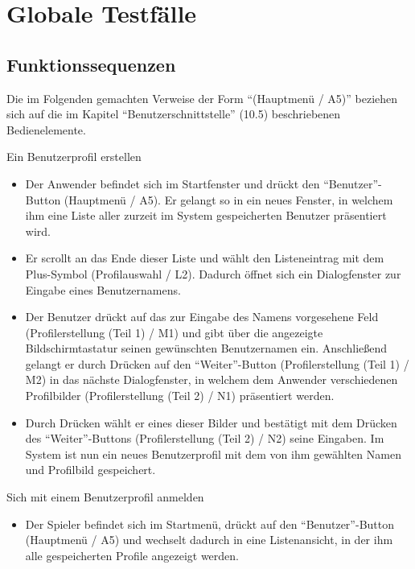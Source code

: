\section{Globale Testfälle}

\subsection{Funktionssequenzen}

Die im Folgenden gemachten Verweise der Form "`(Hauptmenü / A5)"' beziehen sich auf die im Kapitel "`Benutzerschnittstelle"'  (10.5) beschriebenen Bedienelemente.

\begin{requirements}

	 Ein Benutzerprofil erstellen
	
	
	\begin{itemize}
  			\item Der Anwender befindet sich im Startfenster und drückt den "`Benutzer"'-Button (Hauptmenü / A5). Er gelangt so in ein neues Fenster, in welchem ihm eine Liste aller zurzeit im System gespeicherten Benutzer präsentiert wird.
  			
  			\item Er scrollt an das Ende dieser Liste und wählt den Listeneintrag mit dem Plus-Symbol (Profilauswahl / L2). Dadurch öffnet sich ein Dialogfenster zur Eingabe eines Benutzernamens.
  			
  			\item Der Benutzer drückt auf das zur Eingabe des Namens vorgesehene Feld (Profilerstellung (Teil 1) / M1) und gibt über die angezeigte Bildschirmtastatur seinen gewünschten Benutzernamen ein. Anschließend gelangt er durch Drücken auf den "`Weiter"'-Button (Profilerstellung (Teil 1) / M2) in das nächste Dialogfenster, in welchem dem Anwender verschiedenen Profilbilder (Profilerstellung (Teil 2) / N1) präsentiert werden.
  			
  			\item Durch Drücken wählt er eines dieser Bilder und bestätigt mit dem Drücken des "`Weiter"'-Buttons (Profilerstellung (Teil 2) / N2) seine Eingaben. Im System ist nun ein neues Benutzerprofil mit dem von ihm gewählten Namen und Profilbild gespeichert.
  	\end{itemize}
  	
  	
  	
  	 Sich mit einem Benutzerprofil anmelden
  	
  	\begin{itemize}
  			\item Der Spieler befindet sich im Startmenü, drückt auf den "`Benutzer"'-Button (Hauptmenü / A5) und wechselt dadurch in eine Listenansicht, in der ihm alle gespeicherten Profile angezeigt werden.
  			

\end{itemize}
\end{requirements}
